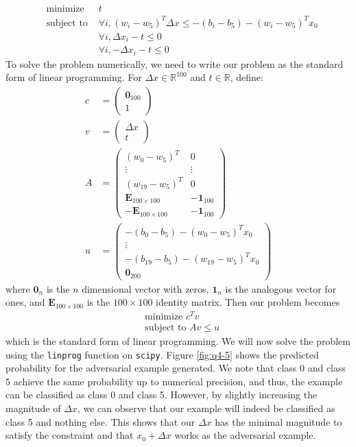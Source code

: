 \documentclass[
	12pt, %
]{../Template/fphw}
\begin{document}
\begin{enumerate}[label = (\arabic*)]
    \begin{align}
        &\textrm{minimize } &t \\
        &\textrm{subject to } &\forall i, (w_i-w_5)^T \Delta x \leq -(b_i-b_5) - (w_i-w_5)^Tx_0  \\
        & & \forall i, \Delta x_i -t \leq 0\\
        & & \forall i, -\Delta x_i -t \leq 0
    \end{align}
    To solve the problem numerically, we need to write our problem as the standard form of linear programming. For $\Delta x\in \mathbb{R}^{100}$ and $t\in \mathbb{R}$, define:
    \begin{align}
        c &= \begin{pmatrix}\textbf{0}_{100} \\ 1\end{pmatrix}\\
        v &= \begin{pmatrix} \Delta x \\ t \end{pmatrix} \\
        A &= \begin{pmatrix}
            (w_0-w_5)^T & 0 \\
            \vdots & \vdots \\
            (w_{19}-w_5)^T & 0 \\
            \textbf{E}_{100\times 100} & -\textbf{1}_{100} \\
            -\textbf{E}_{100\times 100} & -\textbf{1}_{100}
        \end{pmatrix} \\
        u &= \begin{pmatrix}-(b_0-b_5) - (w_0-w_5)^T x_0 \\ \vdots \\ -(b_{19}-b_5) - (w_{19}-w_5)^T x_0 \\ \textbf{0}_{200}\end{pmatrix}
    \end{align}
    where $\textbf{0}_{n}$ is the $n$ dimensional vector with zeros, $\textbf{1}_n$ is the analogous vector for ones, and $\textbf{E}_{100\times 100}$ is the $100\times 100$ identity matrix. Then our problem becomes
    \begin{align}
        &\textrm{minimize } c^T v \\
        &\textrm{subject to }  Av \leq u
    \end{align}
    which is the standard form of linear programming. We will now solve the problem using the \verb|linprog| function on \verb|scipy|. Figure \ref{fig:q4-5} shows the predicted probability for the adversarial example generated. We note that class 0 and class 5 achieve the same probability up to numerical precision, and thus, the example can be classified as class 0 and class 5. However, by slightly increasing the magnitude of $\Delta x$, we can observe that our example will indeed be classified as class 5 and nothing else. This shows that our $\Delta x$ has the minimal magnitude to satisfy the constraint and that $x_0+\Delta x$ works as the adversarial example.

\end{enumerate}
\end{document}
